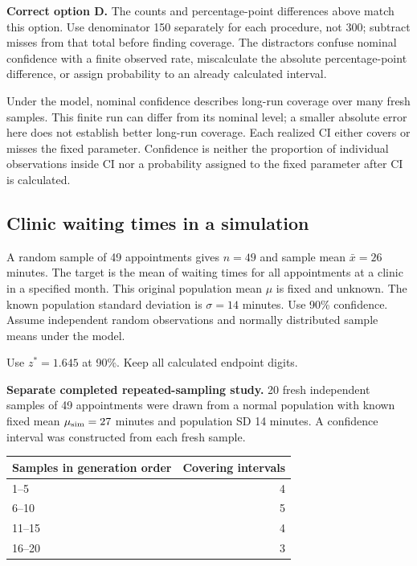 \textbf{Correct option D.} The counts and percentage-point differences above match this option. Use denominator 150 separately for each procedure, not 300; subtract misses from that total before finding coverage. The distractors confuse nominal confidence with a finite observed rate, miscalculate the absolute percentage-point difference, or assign probability to an already calculated interval.

Under the model, nominal confidence describes long-run coverage over many fresh samples. This finite run can differ from its nominal level; a smaller absolute error here does not establish better long-run coverage. Each realized $\mathrm{CI}$ either covers or misses the fixed parameter. Confidence is neither the proportion of individual observations inside $\mathrm{CI}$ nor a probability assigned to the fixed parameter after $\mathrm{CI}$ is calculated.
\par\nopagebreak[4]
\par\vspace{3mm}
\clearpage
\subsection{Clinic waiting times in a simulation}
\label{prob:c2-3}

A random sample of 49 appointments gives $n=49$ and sample mean $\bar{x}=26$ minutes. The target is the mean of waiting times for all appointments at a clinic in a specified month. This original population mean $\mu$ is fixed and unknown. The known population standard deviation is $\sigma=14$ minutes. Use 90\% confidence. Assume independent random observations and normally distributed sample means under the model.

Use $z^*=1.645$ at 90\%. Keep all calculated endpoint digits.

\textbf{Separate completed repeated-sampling study.} 20 fresh independent samples of 49 appointments were drawn from a normal population with known fixed mean $\mu_{\rm sim}=27$ minutes and population SD 14 minutes. A confidence interval was constructed from each fresh sample.
\begin{center}\begin{tabular}{@{}lr@{}}\toprule
Samples in generation order & Covering intervals\\\midrule
1--5 & 4 \\[6pt]
6--10 & 5 \\[6pt]
11--15 & 4 \\[6pt]
16--20 & 3 \\[6pt]
\bottomrule\end{tabular}\end{center}

